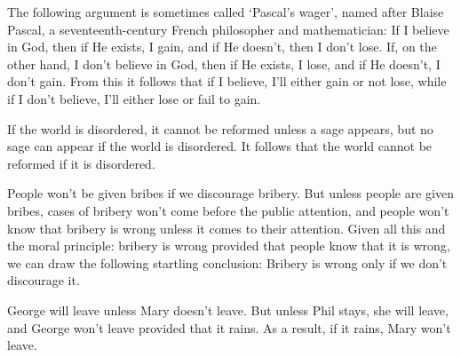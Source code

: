 \begin{enumerate}
	\begin{statement}{ The following argument is sometimes called ‘Pascal's wager',
			named after Blaise Pascal, a seventeenth-century French philosopher and
			mathematician: If I believe in God, then if He exists, I gain, and if He
			doesn't, then I don't lose. If, on the other hand, I don't believe in God,
			then if He exists, I lose, and if He doesn't, I don't gain. From this it
			follows that if I believe, I'll either gain or not lose, while if I don't
			believe, I'll either lose or fail to gain.}
	\end{statement}

	\begin{statement} {If the world is disordered, it cannot be reformed unless a
			sage appears, but no sage can appear if the world is disordered. It follows
			that the world cannot be reformed if it is disordered.}
	\end{statement}

	\begin{statement} { People won't be given bribes if we discourage bribery. But
			unless people are given bribes, cases of bribery won't come before the
			public attention, and people won't know that bribery is wrong unless it
			comes to their attention. Given all this and the moral principle: bribery is
			wrong provided that people know that it is wrong, we can draw the following
			startling conclusion: Bribery is wrong only if we don't discourage it. }
	\end{statement}

	\begin{statement} {George will leave unless Mary doesn't leave. But unless Phil
			stays, she will leave, and George won't leave provided that it rains. As a
			result, if it rains, Mary won't leave. }
	\end{statement}


\end{enumerate}
